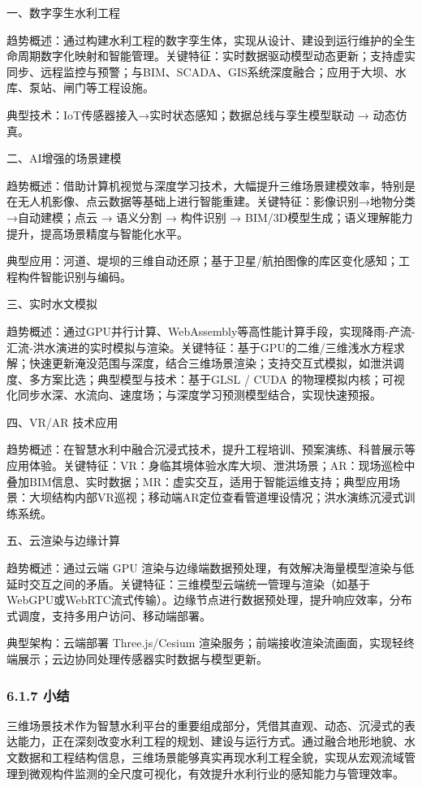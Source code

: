 一、数字孪生水利工程

趋势概述：通过构建水利工程的数字孪生体，实现从设计、建设到运行维护的全生命周期数字化映射和智能管理。关键特征：实时数据驱动模型动态更新；支持虚实同步、远程监控与预警；与BIM、SCADA、GIS系统深度融合；应用于大坝、水库、泵站、闸门等工程设施。

典型技术：IoT传感器接入→实时状态感知；数据总线与孪生模型联动 → 动态仿真。

二、AI增强的场景建模

趋势概述：借助计算机视觉与深度学习技术，大幅提升三维场景建模效率，特别是在无人机影像、点云数据等基础上进行智能重建。关键特征：影像识别→地物分类→自动建模；点云 → 语义分割 → 构件识别 → BIM/3D模型生成；语义理解能力提升，提高场景精度与智能化水平。

典型应用：河道、堤坝的三维自动还原；基于卫星/航拍图像的库区变化感知；工程构件智能识别与编码。

三、实时水文模拟

趋势概述：通过GPU并行计算、WebAssembly等高性能计算手段，实现降雨-产流-汇流-洪水演进的实时模拟与渲染。关键特征：基于GPU的二维/三维浅水方程求解；快速更新淹没范围与深度，结合三维场景渲染；支持交互式模拟，如泄洪调度、多方案比选；典型模型与技术：基于GLSL / CUDA 的物理模拟内核；可视化同步水深、水流向、速度场；与深度学习预测模型结合，实现快速预报。

四、VR/AR 技术应用

趋势概述：在智慧水利中融合沉浸式技术，提升工程培训、预案演练、科普展示等应用体验。关键特征：VR：身临其境体验水库大坝、泄洪场景；AR：现场巡检中叠加BIM信息、实时数据；MR：虚实交互，适用于智能运维支持；典型应用场景：大坝结构内部VR巡视；移动端AR定位查看管道埋设情况；洪水演练沉浸式训练系统。

五、云渲染与边缘计算

趋势概述：通过云端 GPU 渲染与边缘端数据预处理，有效解决海量模型渲染与低延时交互之间的矛盾。关键特征：三维模型云端统一管理与渲染（如基于WebGPU或WebRTC流式传输）。边缘节点进行数据预处理，提升响应效率，分布式调度，支持多用户访问、移动端部署。

典型架构：云端部署 Three.js/Cesium 渲染服务；前端接收渲染流画面，实现轻终端展示；云边协同处理传感器实时数据与模型更新。

\subsubsection{6.1.7 小结}\label{ux5c0fux7ed3}

三维场景技术作为智慧水利平台的重要组成部分，凭借其直观、动态、沉浸式的表达能力，正在深刻改变水利工程的规划、建设与运行方式。通过融合地形地貌、水文数据和工程结构信息，三维场景能够真实再现水利工程全貌，实现从宏观流域管理到微观构件监测的全尺度可视化，有效提升水利行业的感知能力与管理效率。

